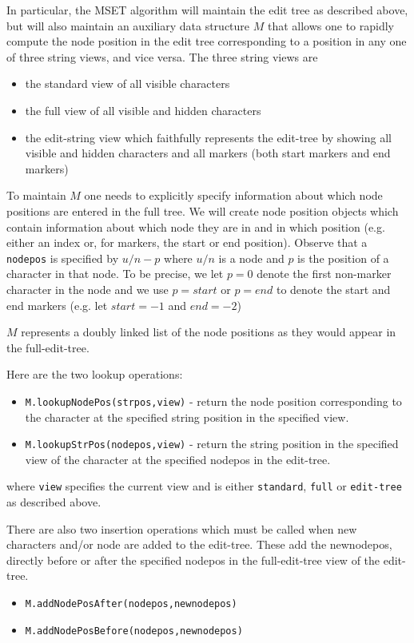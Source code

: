 \documentclass{amsart}
\begin{document}
In particular, the MSET algorithm will maintain the edit tree as described above,
but will also maintain an auxiliary data structure $M$ that allows one to rapidly
compute the node position in the edit tree corresponding to a position in any one
of three string views, and vice versa. The three string views are
\begin{itemize}
\item the standard view of all visible characters
\item the full view of all visible and hidden characters
\item the edit-string view which faithfully represents the edit-tree by showing
all visible and hidden characters and all markers (both
start markers and end markers)
\end{itemize}

To maintain $M$ one needs to
explicitly specify information about which node positions are entered in the full
tree.  We will create node position objects which contain information about 
which node they are in and in which position (e.g. either an index or, for
markers, the start or end position). Observe that a {\tt nodepos} is specified
by $u/n-p$ where $u/n$ is a node and $p$ is the position of a character
in that node. To be precise, we let $p=0$ denote the first non-marker
character in the node and we use $p=start$ or $p=end$ to denote the start
and end markers (e.g. let $start=-1$ and $end=-2$)

$M$ represents a doubly linked list of the node positions as they would appear 
in the full-edit-tree.

Here are the two lookup operations:
\begin{itemize}
\item {\tt M.lookupNodePos(strpos,view)} - return the node position corresponding
to the character at the specified string position in the specified view.

\item {\tt M.lookupStrPos(nodepos,view)} - return the string position in the
specified view of the character at the specified nodepos in the edit-tree.
\end{itemize}
where {\tt view} specifies the current view and is either {\tt standard},
{\tt full} or {\tt edit-tree} as described above.

There are also two insertion operations which must be called when
new characters and/or node are added to the edit-tree. 
These add the newnodepos, directly before or after the specified nodepos in the
full-edit-tree view of the edit-tree.
\begin{itemize}

\item {\tt M.addNodePosAfter(nodepos,newnodepos)}

\item {\tt M.addNodePosBefore(nodepos,newnodepos)}

\end{itemize}
\end{document}
